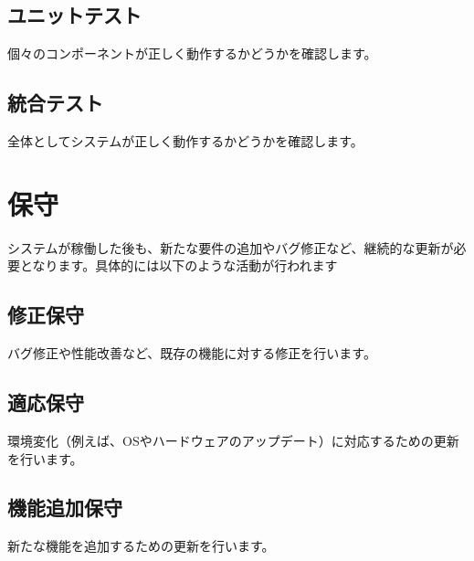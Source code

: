 \section{ユニットテスト}
個々のコンポーネントが正しく動作するかどうかを確認します。




\section{統合テスト}
全体としてシステムが正しく動作するかどうかを確認します。



\chapter{保守}
システムが稼働した後も、新たな要件の追加やバグ修正など、継続的な更新が必要となります。具体的には以下のような活動が行われます




\section{修正保守}
バグ修正や性能改善など、既存の機能に対する修正を行います。




\section{適応保守}
環境変化（例えば、OSやハードウェアのアップデート）に対応するための更新を行います。




\section{機能追加保守}
新たな機能を追加するための更新を行います。
